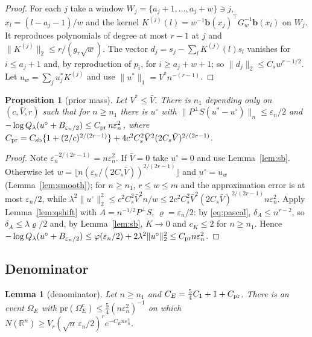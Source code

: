 \documentclass[11pt]{article}
\newtheorem{lemma}{Lemma}
\newtheorem{proposition}{Proposition}
\theoremstyle{definition}
\theoremstyle{remark}
\newcommand{\R}{\mathbb{R}}
\newcommand{\pr}{\mathrm{pr}}
\newcommand{\en}{\varepsilon_n}
\newcommand{\Ql}{Q_\lambda}
\newcommand{\Pp}{P^{\perp}}
\newcommand{\Vb}{\bar V}
\newcommand{\nn}[1]{\|#1\|_n}
\begin{document}
\begin{proof}
For each $j$ take a window $W_j=\{a_j+1,\dots,a_j+w\}\ni j$, $x_l=(l-a_j-1)/w$ and the kernel $K^{(j)}(l)=w^{-1}\mathbf b(x_j)^\top G_w^{-1}\mathbf b(x_l)$ on $W_j$. It reproduces polynomials of degree at most $r-1$ at $j$ and $\|K^{(j)}\|_2\le r/(g_r\sqrt w)$. The vector $d_j=s_j-\sum_lK^{(j)}(l)s_l$ vanishes for $i\le a_j+1$ and, by reproduction of $p_i$, for $i\ge a_j+w+1$; so $\|d_j\|_2\le C_sw^{r-1/2}$. Let $u_w=\sum_ju^{*}_jK^{(j)}$ and use $\|u^{*}\|_1=V^{*}n^{-(r-1)}$.
\end{proof}

\begin{proposition}[prior mass]\label{prop:prior}
Let $V^{*}\le\Vb$. There is $n_1$ depending only on $(c,\Vb,r)$ such that for $n\ge n_1$ there is $u^\circ$ with
$\nn{\Pp S(u^{*}-u^\circ)}\le\en/2$ and $-\log\Ql(u^\circ+B_{\en/2})\le C_{\rm pr}\,n\en^2$, where
$C_{\rm pr}=C_{\rm sb}\{1+(2/c)^{2/(2r-1)}\}+4c^2C_s^2\Vb^2(2C_s\Vb)^{2/(2r-1)}$.
\end{proposition}

\begin{proof}
Note $\en^{-2/(2r-1)}=n\en^2$. If $\Vb=0$ take $u^\circ=0$ and use Lemma~\ref{lem:sb}. Otherwise let $w=\lfloor n(\en/(2C_s\Vb))^{2/(2r-1)}\rfloor$ and $u^\circ=u_w$ (Lemma~\ref{lem:smooth}); for $n\ge n_1$, $r\le w\le m$ and the approximation error is at most $\en/2$, while
$\lambda^2\|u^\circ\|_2^2\le c^2C_s^2\Vb^2n/w\le2c^2C_s^2\Vb^2(2C_s\Vb)^{2/(2r-1)}n\en^2$.
Apply Lemma~\ref{lem:qshift} with $A=n^{-1/2}\Pp S$, $\varrho=\en/2$: by \eqref{eq:pascal}, $\delta_A\le n^{r-2}$, so $\delta_A\le\lambda\varrho/2$ and, by Lemma~\ref{lem:sb}, $K\to0$ and $c_K\le2$ for $n\ge n_1$. Hence $-\log\Ql(u^\circ+B_{\en/2})\le\varphi(\en/2)+2\lambda^2\|u^\circ\|_2^2\le C_{\rm pr}n\en^2$.
\end{proof}

\subsection{Denominator}

\begin{lemma}[denominator]\label{lem:evid}
Let $n\ge n_1$ and $C_E=\tfrac54C_1+1+C_{\rm pr}$. There is an event $\Omega_E$ with $\pr(\Omega_E^c)\le\tfrac54(n\en^2)^{-1}$ on which $N(\R^n)\ge V_r(\sqrt n\,\en/2)^re^{-C_En\en^2}$.
\end{lemma}
\end{document}
